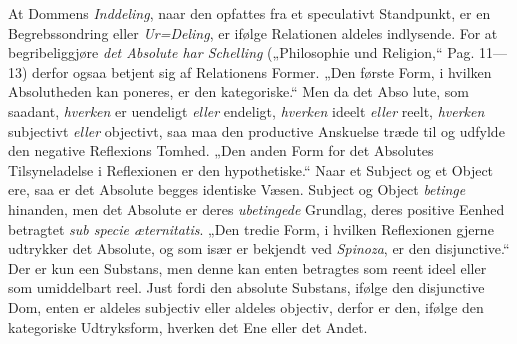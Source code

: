\documentclass[12pt]{book}
\newcommand{\opage}[1]{\marginnote{\footnotesize\textit{[#1]}}}
\begin{document}
At Dommens \emph{Inddeling}, naar den opfattes fra et speculativt Standpunkt, er
en Begrebssondring eller \emph{Ur=Deling}, er ifølge Relationen aldeles
indlysende. For at begribeliggjøre \emph{det Absolute har Schelling}
(„Philosophie und Religion,“ Pag. 11---13) derfor ogsaa betjent sig af
Relationens Former. „Den første Form, i hvilken Absolutheden kan poneres, er den
kategoriske.“ Men da det Abso%
\opage{53}lute, som saadant, \emph{hverken} er uendeligt \emph{eller} endeligt,
\emph{hverken} ideelt \emph{eller} reelt, \emph{hverken} subjectivt
\emph{eller} objectivt, saa maa den productive Anskuelse træde til og udfylde
den negative Reflexions Tomhed. „Den anden Form for det Absolutes Tilsyneladelse
i Reflexionen er den hypothetiske.“ Naar et Subject og et Object ere, saa er det
Absolute begges identiske Væsen. Subject og Object \emph{betinge} hinanden, men
det Absolute er deres \emph{ubetingede} Grundlag, deres positive Eenhed
betragtet \textit{sub specie æternitatis}. „Den tredie Form, i hvilken
Reflexionen gjerne udtrykker det Absolute, og som især er bekjendt ved
\emph{Spinoza}, er den disjunctive.“ Der er kun een Substans, men denne kan
enten betragtes som reent ideel eller som umiddelbart reel. Just fordi den
absolute Substans, ifølge den disjunctive Dom, enten er aldeles subjectiv eller
aldeles objectiv, derfor er den, ifølge den kategoriske Udtryksform, hverken det
Ene eller det Andet.
\end{document}
